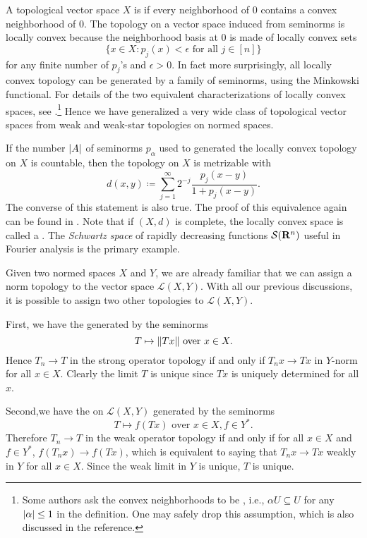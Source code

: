 A topological vector space $X$ is  if every neighborhood of $0$ contains a convex neighborhood of $0$. The topology on a vector space induced from seminorms is locally convex because the neighborhood basis at $0$ is made of locally convex sets \[
    \bigl\{x \in X: p_j(x) < \epsilon \text{ for all } j \in [n]\bigr\}
\] for any finite number of $p_j$'s and $\epsilon > 0$. In fact more surprisingly, all locally convex topology can be generated by a family of seminorms, using the Minkowski functional. For details of the two equivalent characterizations of locally convex spaces, see \cite[Section~8.1]{Bogachev_2020}.\footnote{Some authors ask the convex neighborhoods to be , i.e., $\alpha U \subseteq U$ for any $\lvert \alpha \rvert \leq 1$ in the definition. One may safely drop this assumption, which is also discussed in the reference.} Hence we have generalized a very wide class of topological vector spaces from weak and weak-star topologies on normed spaces.

If the number $\lvert A \rvert$ of seminorms $p_\alpha$ used to generated the locally convex topology on $X$ is countable, then the topology on $X$ is metrizable with \[
    d(x,y) \coloneqq \sum_{j=1}^\infty 2^{-j}\frac{p_j(x-y)}{1+p_j(x-y)}.
\] The converse of this statement is also true. The proof of this equivalence again can be found in \cite[Proposition~8.6.1]{Bogachev_2020}. Note that if $(X,d)$ is complete, the locally convex space is called a . The \emph{Schwartz space} of rapidly decreasing functions $\mathcal S(\mathbf{R}^n)$ useful in Fourier analysis is the primary example.


Given two normed spaces $X$ and $Y$, we are already familiar that we can assign a norm topology to the vector space $\mathcal{L}(X,Y)$. With all our previous discussions, it is possible to assign two other topologies to $\mathcal L(X,Y)$.

First, we have the  generated by the seminorms \[T \mapsto \lVert Tx \rVert \text{ over }x \in X.\]  Hence $T_n \to T$ in the strong operator topology if and only if $T_n x \to Tx$ in $Y$-norm for all $x\in X$. Clearly the limit $T$ is unique since $Tx$ is uniquely determined for all $x$.

Second,we have the  on $\mathcal L(X,Y)$ generated by the seminorms \[
    T \mapsto f(Tx)\text{ over }x \in X,f\in Y^*.
\] Therefore $T_n \to T$ in the weak operator topology if and only if for all $x \in X$ and $f \in Y^*$, $f(T_n x) \to f(T x)$, which is equivalent to saying that $T_n x \to Tx$ weakly in $Y$ for all $x \in X$. Since the weak limit in $Y$ is unique, $T$ is unique.

